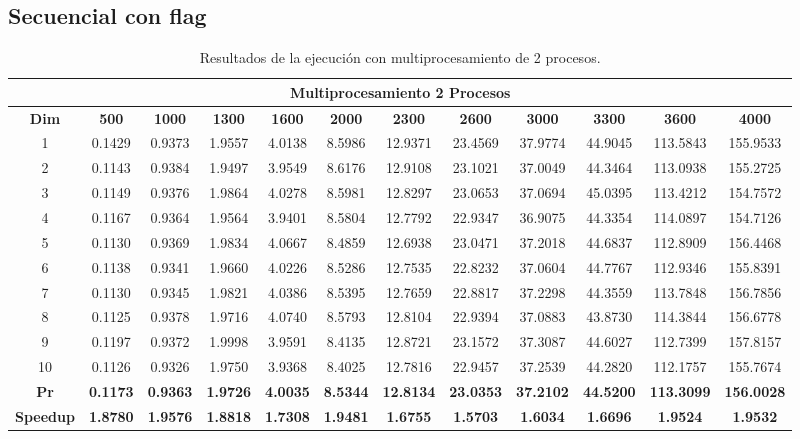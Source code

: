 \documentclass{article}
\begin{document}

\subsection{Secuencial con flag}

\begin{table}[H]
\centering
\tiny
\begin{tabular}{|c|c|c|c|c|c|c|c|c|c|c|c|}
\hline
\multicolumn{12}{|c|}{\textbf{Multiprocesamiento 2 Procesos}} \\
\hline
\textbf{Dim} & \textbf{500} & \textbf{1000} & \textbf{1300} & \textbf{1600} & \textbf{2000} & \textbf{2300} & \textbf{2600} & \textbf{3000} & \textbf{3300} & \textbf{3600} & \textbf{4000} \\
\hline
1  & 0.1429 & 0.9373 & 1.9557 & 4.0138 & 8.5986 & 12.9371 & 23.4569 & 37.9774 & 44.9045 & 113.5843 & 155.9533 \\
2  & 0.1143 & 0.9384 & 1.9497 & 3.9549 & 8.6176 & 12.9108 & 23.1021 & 37.0049 & 44.3464 & 113.0938 & 155.2725 \\
3  & 0.1149 & 0.9376 & 1.9864 & 4.0278 & 8.5981 & 12.8297 & 23.0653 & 37.0694 & 45.0395 & 113.4212 & 154.7572 \\
4  & 0.1167 & 0.9364 & 1.9564 & 3.9401 & 8.5804 & 12.7792 & 22.9347 & 36.9075 & 44.3354 & 114.0897 & 154.7126 \\
5  & 0.1130 & 0.9369 & 1.9834 & 4.0667 & 8.4859 & 12.6938 & 23.0471 & 37.2018 & 44.6837 & 112.8909 & 156.4468 \\
6  & 0.1138 & 0.9341 & 1.9660 & 4.0226 & 8.5286 & 12.7535 & 22.8232 & 37.0604 & 44.7767 & 112.9346 & 155.8391 \\
7  & 0.1130 & 0.9345 & 1.9821 & 4.0386 & 8.5395 & 12.7659 & 22.8817 & 37.2298 & 44.3559 & 113.7848 & 156.7856 \\
8  & 0.1125 & 0.9378 & 1.9716 & 4.0740 & 8.5793 & 12.8104 & 22.9394 & 37.0883 & 43.8730 & 114.3844 & 156.6778 \\
9  & 0.1197 & 0.9372 & 1.9998 & 3.9591 & 8.4135 & 12.8721 & 23.1572 & 37.3087 & 44.6027 & 112.7399 & 157.8157 \\
10 & 0.1126 & 0.9326 & 1.9750 & 3.9368 & 8.4025 & 12.7816 & 22.9457 & 37.2539 & 44.2820 & 112.1757 & 155.7674 \\
\hline
\textbf{Pr} & \textbf{0.1173} & \textbf{0.9363} & \textbf{1.9726} & \textbf{4.0035} & \textbf{8.5344} & \textbf{12.8134} & \textbf{23.0353} & \textbf{37.2102} & \textbf{44.5200} & \textbf{113.3099} & \textbf{156.0028} \\
\hline
\textbf{Speedup} & \textbf{1.8780} & \textbf{1.9576} & \textbf{1.8818} & \textbf{1.7308} & \textbf{1.9481} & \textbf{1.6755} & \textbf{1.5703} & \textbf{1.6034} & \textbf{1.6696} & \textbf{1.9524} & \textbf{1.9532} \\
\hline
\end{tabular}
\label{tab:mp2}
\caption{Resultados de la ejecución con multiprocesamiento de 2 procesos.}
\end{table}
\end{document}
